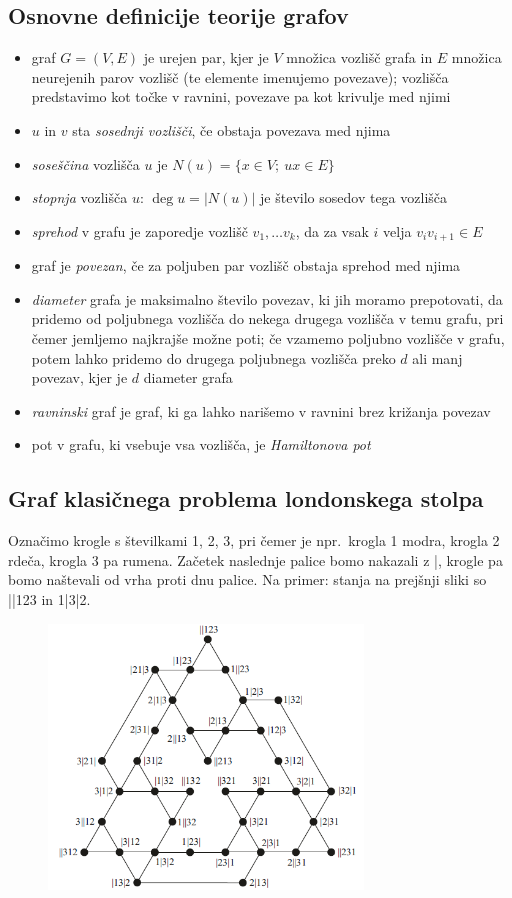 \documentclass[11pt]{article}
\theoremstyle{definition} %
\theoremstyle{plain} %
\DeclareMathOperator {\stopnja} {deg}
\begin{document}
\subsection{Osnovne definicije teorije grafov}
\begin{itemize}
    \item graf $ G = (V, E) $ je urejen par, kjer je $V$ množica vozlišč grafa in $E$ množica neurejenih parov vozlišč (te elemente imenujemo povezave); vozlišča predstavimo kot točke v ravnini, povezave pa kot krivulje med njimi
    \item $u$ in $v$ sta \emph{sosednji vozlišči}, če obstaja povezava med njima
    \item \emph{soseščina} vozlišča $u$ je $N(u) = \{x \in V;\ ux \in E\}$
    \item \emph{stopnja} vozlišča $u$: $\stopnja u  = \lvert N(u) \rvert$ je število sosedov tega vozlišča
    \item \emph{sprehod} v grafu je zaporedje vozlišč $v_1,\ldots v_k$, da za vsak $i$ velja $v_i v_{i+1} \in E$
    \item graf je \emph{povezan}, če za poljuben par vozlišč obstaja sprehod med njima
    \item \emph{diameter} grafa je maksimalno število povezav, ki jih moramo prepotovati, da pridemo od poljubnega vozlišča do nekega drugega vozlišča v temu grafu, pri čemer jemljemo najkrajše možne poti; če vzamemo poljubno vozlišče v grafu, potem lahko pridemo do drugega poljubnega vozlišča preko $d$ ali manj povezav, kjer je $d$ diameter grafa
    \item \emph{ravninski} graf je graf, ki ga lahko narišemo v ravnini brez križanja povezav
    \item pot v grafu, ki vsebuje vsa vozlišča, je \emph{Hamiltonova pot}
\end{itemize}


\subsection{Graf klasičnega problema londonskega stolpa}
Označimo krogle s številkami 1, 2, 3, pri čemer je npr.\ krogla 1 modra, krogla 2 rdeča, krogla 3 pa rumena. Začetek naslednje palice bomo nakazali z |, krogle pa bomo naštevali od vrha proti dnu palice.
Na primer: stanja na prejšnji sliki so ||123 in 1|3|2.
\begin{figure}[h]
    \centering
    \includegraphics[height=200pt]{img/tolgraph.png}
\end{figure}
\end{document}

